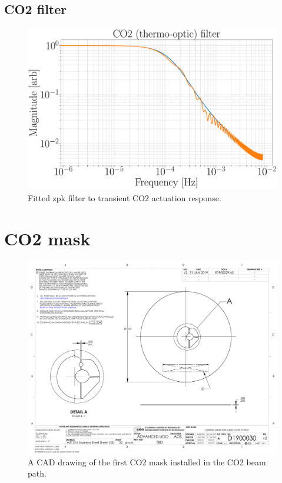\subsection{CO2 filter}
\begin{figure}[H]
\includegraphics[width=\textwidth]{figs/TCS/CO2_zpk.pdf}
\caption{Fitted zpk filter to transient CO2 actuation response.}
\label{fig:co2_zpk_fit}
\end{figure}

\section{CO2 mask}\label{sec:CO2mask}
\begin{figure}[H]
\includegraphics[width=\textwidth]{figs/TCS/CO2mask/D1900030-v2.PDF}
\caption{A CAD drawing of the first CO2 mask installed in the CO2 beam path.}
\label{fig:co2mask1}
\end{figure}




